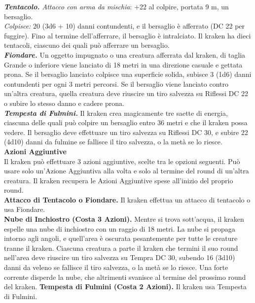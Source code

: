 \begin{multicols}{2}
\emph{\textbf{Tentacolo.} Attacco con arma da mischia}: +22 al colpire, portata 9 m, un bersaglio.\\

\emph{Colpisce:} 20 (3d6 + 10) danni contundenti, e il bersaglio è afferrato (DC  22 per fuggire). Fino al termine dell'afferrare, il bersaglio è intralciato. Il kraken ha dieci tentacoli, ciascuno dei quali può afferrare un bersaglio.\\

\emph{\textbf{Fiondare.}} Un oggetto impugnato o una creatura afferrata dal kraken, di taglia Grande o inferiore viene lanciato di 18 metri in una direzione casuale e gettata prona. Se il bersaglio lanciato colpisce una superficie solida, subisce 3 (1d6) danni contundenti per ogni 3 metri percorsi. Se il bersaglio viene lanciato contro un'altra creatura, quella creatura deve riuscire un tiro salvezza su Riflessi DC  22 o subire lo stesso danno e cadere prona.\\

\emph{\textbf{Tempesta di Fulmini.}} Il kraken crea magicamente tre saette di energia, ciascuna delle quali può colpire un bersaglio entro 36 metri e che il kraken possa vedere. Il bersaglio deve effettuare un tiro salvezza su Riflessi DC  30, e subire 22 (4d10) danni da fulmine se fallisce il tiro salvezza, o la metà se lo riesce.\\

\textbf{Azioni Aggiuntive}\\

Il kraken può effettuare 3 azioni aggiuntive, scelte tra le opzioni seguenti. Può usare solo un'Azione Aggiuntiva alla volta e solo al termine del round di un'altra creatura. Il kraken recupera le Azioni Aggiuntive spese all'inizio del proprio round.\\

\textbf{Attacco di Tentacolo o Fiondare.} Il kraken effettua un attacco di tentacolo o usa Fiondare.\\

\textbf{Nube di Inchiostro (Costa 3 Azioni).} Mentre si trova sott'acqua, il kraken espelle una nube di inchiostro con un raggio di 18 metri. La nube si propaga intorno agli angoli, e quell'area è oscurata pesantemente per tutte le creature tranne il kraken. Ciascuna creatura a parte il kraken che termini il suo round nell'area deve riuscire un tiro salvezza su Tempra DC  30, subendo 16 (3d10) danni da veleno se fallisce il tiro salvezza, o la metà se lo riesce. Una forte corrente disperde la nube, che altrimenti svanisce al termine del prossimo round del kraken. \textbf{Tempesta di Fulmini (Costa 2 Azioni).} Il kraken usa Tempesta di Fulmini.\\


\end{multicols}
